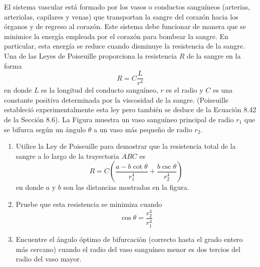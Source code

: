 \item El sistema vascular está formado por los vasos o conductos sanguíneos (arterias, arteriolas, capilares y venas) que transportan la sangre del corazón hacia los órganos y de regreso al corazón. Este sistema debe funcionar de manera que se minimice la energía empleada por el corazón para bombear la sangre. En particular, esta energía se reduce cuando disminuye la resistencia de la sangre. Una de las Leyes de Poiseuille proporciona la resistencia $R$ de la sangre en la forma
$$R = C \frac{L}{r^4}$$
en donde $L$ es la longitud del conducto sanguíneo, $r$ es el radio y $C$ es una constante positiva determinada por la viscosidad de la sangre. (Poiseuille estableció experimentalmente esta ley pero también se deduce de la Ecuación 8.42 de la Sección 8.6). La Figura muestra un vaso sanguíneo principal de radio $r_1$ que se bifurca según un ángulo $\theta$ a un vaso más pequeño de radio $r_2$.
\begin{enumerate}
    \item[(a)] Utilice la Ley de Poiseuille para demostrar que la resistencia total de la sangre a lo largo de la trayectoria $ABC$ es
    $$R = C \left( \frac{a - b \cot \theta}{r_1^4} + \frac{b \csc \theta}{r_2^4} \right)$$
    en donde $a$ y $b$ son las distancias mostradas en la figura.
    \item[(b)] Pruebe que esta resistencia se minimiza cuando
    $$\cos \theta = \frac{r_2^4}{r_1^4}$$
    \item[(c)] Encuentre el ángulo óptimo de bifurcación (correcto hasta el grado entero más cercano) cuando el radio del vaso sanguíneo menor es dos tercios del radio del vaso mayor.
\end{enumerate}
\begin{center}
\end{center}
